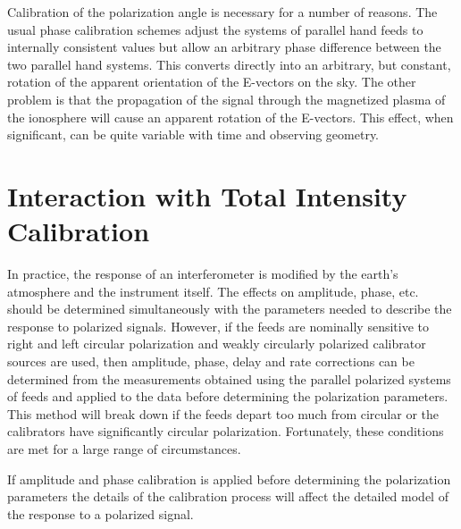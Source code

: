    Calibration of the polarization angle is necessary for a number of
reasons.  The usual phase calibration schemes adjust the systems of
parallel hand feeds to internally consistent values but allow an
arbitrary phase difference between the two parallel hand systems.
This converts directly into an arbitrary, but constant, rotation of
the apparent orientation of the E-vectors on the sky.  The other
problem is that the propagation of the signal through the magnetized
plasma of the ionosphere will cause an apparent rotation of the
E-vectors.  This effect, when significant, can be quite variable with
time and observing geometry.

\section {Interaction with Total Intensity Calibration}

   In practice, the response of an interferometer is modified by the
earth's atmosphere and the instrument itself.  The effects on
amplitude, phase, etc. should be determined simultaneously with the
parameters needed to describe the response to polarized signals.
However, if the feeds are nominally sensitive to right and left
circular polarization and weakly circularly polarized calibrator
sources are used, then amplitude, phase, delay and rate corrections
can be determined from the measurements obtained using the parallel
polarized systems of feeds and applied to the data before determining
the polarization parameters.  This method will break down if the feeds
depart too much from circular or the calibrators have significantly
circular polarization.  Fortunately, these conditions are met for a
large range of circumstances.

   If amplitude and phase calibration is applied before determining
the polarization parameters the details of the calibration process
will affect the detailed model of the response to a polarized signal.

